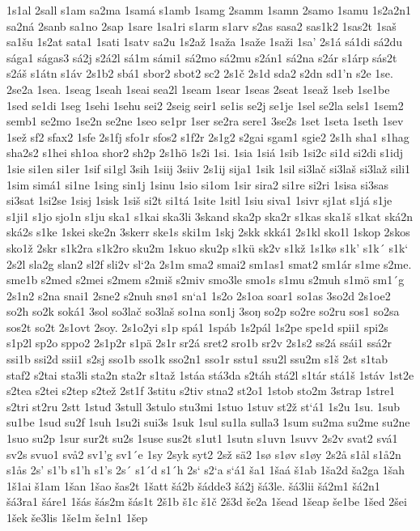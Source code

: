 1s1al
2sall
s1am
sa2ma
1samá
s1amb
1samg
2samm
1samn
2samo
1samu
1s2a2n1
sa2ná
2sanb
sa1no
2sap
1sare
1sa1ri
s1arm
s1arv
s2as
sasa2
sas1k2
1sas2t
1saš
sa1šu
1s2at
sata1
1sati
1satv
sa2u
1s2až
1saža
1saže
1saži
1sa'
2s1á
sá1di
sá2du
sága1
ságas3
sá2j
s2á2l
sá1m
sámi1
sá2mo
sá2mu
s2án1
sá2na
s2ár
s1árp
sás2t
s2áš
s1átn
s1áv
2s1b2
sbá1
sbor2
sbot2
sc2
2s1č
2s1d
sda2
s2dn
sd1'n
s2e
1se.
2se2a
1sea.
1seag
1seah
1seai
sea2l
1seam
1sear
1seas
2seat
1seaž
1seb
1se1be
1sed
se1di
1seg
1sehi
1sehu
sei2
2seig
seir1
se1is
se2j
se1je
1sel
se2la
sels1
1sem2
semb1
se2mo
1se2n
se2ne
1seo
se1pr
1ser
se2ra
sere1
3se2s
1set
1seta
1seth
1sev
1sež
sf2
sfax2
1sfe
2s1fj
sfo1r
sfos2
s1f2r
2s1g2
s2gai
sgam1
sgie2
2s1h
sha1
s1hag
sha2s2
s1hei
sh1oa
shor2
sh2p
2s1hö
1s2i
1si.
1sia
1siá
1sib
1si2c
si1d
si2di
s1idj
1sie
si1en
si1er
1sif
si1gl
3sih
1siij
3siiv
2s1ij
sija1
1sik
1sil
si3lač
si3laš
si3laž
sili1
1sim
simá1
si1ne
1sing
sin1j
1sinu
1sio
si1om
1sir
sira2
si1re
si2ri
1sisa
si3sas
si3sat
1si2se
1sisj
1sisk
1siš
si2t
si1tá
1site
1sitl
1siu
siva1
1sivr
sj1at
s1já
s1je
s1ji1
s1jo
sjo1n
s1ju
ska1
s1kai
ska3li
3skand
ska2p
ska2r
s1kas
ska1š
s1kat
ská2n
ská2s
s1ke
1skei
ske2n
3skerr
ske1s
ski1m
1skj
2skk
skká1
2s1kl
sko1l
1skop
2skos
sko1ž
2skr
s1k2ra
s1k2ro
sku2m
1skuo
sku2p
s1kü
sk2v
s1kž
1s1kø
s1k'
s1k´
s1k`
2s2l
sla2g
slan2
sl2f
sli2v
sl`2a
2s1m
sma2
smai2
sm1as1
smat2
sm1ár
s1me
s2me.
sme1b
s2med
s2mei
s2mem
s2miš
s2miv
smo3le
smo1s
s1mu
s2muh
s1mö
sm1´g
2s1n2
s2na
snai1
2sne2
s2nuh
snø1
sn`a1
1s2o
2s1oa
soar1
so1as
3so2d
2s1oe2
so2h
so2k
soká1
3sol
so3lač
so3laš
so1na
son1j
3soŋ
so2p
so2re
so2ru
sos1
so2sa
sos2t
so2t
2s1ovt
2soy.
2s1o2yi
s1p
spá1
1spáb
1s2pál
1s2pe
spe1d
spii1
spi2s
s1p2l
sp2o
sppo2
2s1p2r
s1pä
2s1r
sr2á
sret2
sro1b
sr2v
2s1s2
ss2á
ssái1
ssá2r
ssi1b
ssi2d
ssii1
s2sj
sso1b
sso1k
sso2n1
sso1r
sstu1
ssu2l
ssu2m
s1š
2st
s1tab
staf2
s2tai
sta3li
sta2n
sta2r
s1taž
1stáa
stá3da
s2táh
stá2l
s1tár
stá1š
1stáv
1st2e
s2tea
s2tei
s2tep
s2tež
2st1f
3stitu
s2tiv
stna2
st2o1
1stob
sto2m
3strap
1stre1
s2tri
st2ru
2stt
1stuđ
3stull
3stulo
stu3mi
1stuo
1stuv
st2ž
st`á1
1s2u
1su.
1sub
su1be
1sud
su2f
1suh
1su2i
sui3s
1suk
1sul
su1la
sulla3
1sum
su2ma
su2me
su2ne
1suo
su2p
1sur
sur2t
su2s
1suse
sus2t
s1ut1
1sutn
s1uvn
1suvv
2s2v
svat2
svá1
sv2s
svuo1
svå2
sv1'g
sv1´e
1sy
2syk
syt2
2sž
sä2
1sø
s1øv
s1øy
2s2å
s1ål
s1å2n
s1ås
2s'
s1'b
s1'h
s1's
2s´
s1´d
s1´h
2s`
s2`a
s`á1
ša1
1šaá
š1ab
1ša2d
ša2ga
1šah
1š1ai
š1am
1šan
1šao
šas2t
1šatt
šá2b
šádde3
šá2j
šá3le.
šá3lii
šá2m1
šá2n1
šá3ra1
šáre1
1šás
šás2m
šás1t
2š1b
š1c
š1č
2š3d
še2a
1šead
1šeap
še1be
1šed
2šei
1šek
še3lis
1še1m
še1n1
1šep
